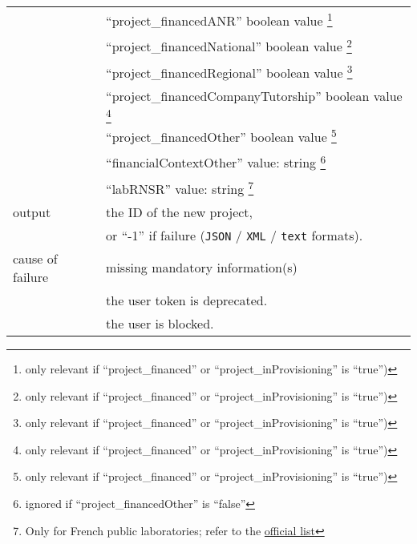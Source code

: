 \begin{tabular}{ | l | l | }
	\space & ``project\_financedANR'' boolean value \footnote{only relevant if ``project\_financed'' or ``project\_inProvisioning'' is ``true'')} \\
	\space & ``project\_financedNational'' boolean value \footnote{only relevant if ``project\_financed'' or ``project\_inProvisioning'' is ``true'')} \\
	\space & ``project\_financedRegional'' boolean value \footnote{only relevant if ``project\_financed'' or ``project\_inProvisioning'' is ``true'')} \\
	\space & ``project\_financedCompanyTutorship'' boolean value \footnote{only relevant if ``project\_financed'' or ``project\_inProvisioning'' is ``true'')} \\
	\space & ``project\_financedOther'' boolean value \footnote{only relevant if ``project\_financed'' or ``project\_inProvisioning'' is ``true'')} \\
	\space & ``financialContextOther'' value: string \footnote{ignored if ``project\_financedOther'' is ``false''} \\
	\space & ``labRNSR'' value: string \footnote{Only for French public laboratories; refer to the \href{https://www.data.gouv.fr/fr/datasets/repertoire-national-des-structures-de-recherche-rnsr/}{official list}} \\
	\hline
	output & the ID of the new project, \\
	\space & or ``-1'' if failure (\texttt{JSON} / \texttt{XML} / \texttt{text} formats). \\
	\hline
	cause of failure & missing mandatory information(s) \\
	\space & the user token is deprecated. \\
	\space & the user is blocked. \\
	\hline
\end{tabular}

